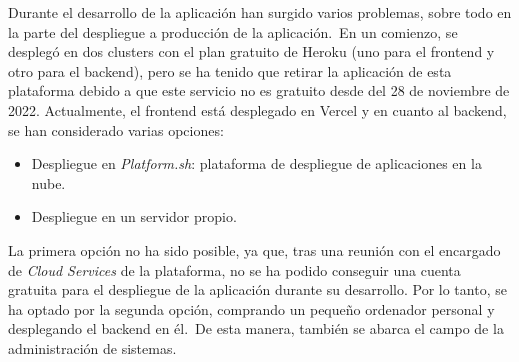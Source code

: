 
Durante el desarrollo de la aplicación han surgido varios problemas, sobre todo en la parte del despliegue a producción
de la aplicación.\ En un comienzo, se desplegó en dos clusters con el plan gratuito de Heroku (uno
para el frontend y otro para el backend), pero se ha tenido que retirar la aplicación de esta plataforma
debido a que este servicio no es gratuito desde del 28 de noviembre de 2022.
Actualmente, el frontend está desplegado en Vercel y en cuanto al backend, se han considerado varias opciones:

\begin{itemize}
	\item Despliegue en \textit{Platform.sh}: plataforma de despliegue de aplicaciones en la nube.
	\item Despliegue en un servidor propio.
\end{itemize}

La primera opción no ha sido posible, ya que, tras una reunión con el encargado de \textit{Cloud Services} de la
plataforma, no se ha podido conseguir una cuenta gratuita para el despliegue de la aplicación durante su desarrollo.
Por lo tanto, se ha optado por la segunda opción, comprando un pequeño ordenador personal y desplegando el backend en
él.\ De esta manera, también se abarca el campo de la administración de sistemas.
